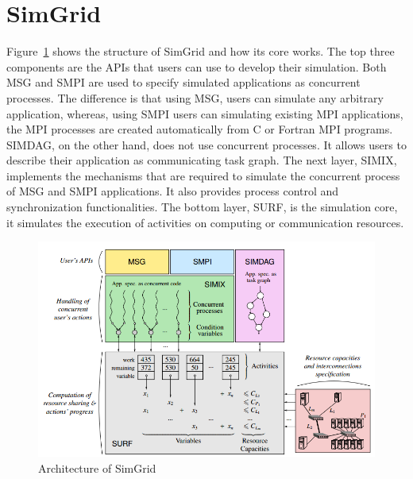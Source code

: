 \section{SimGrid}
Figure~\ref{fig:SimGrid} shows the structure of SimGrid and how its core works. The top three components are the APIs that users can use to develop their simulation. Both MSG and SMPI are used to specify simulated applications as concurrent processes. The difference is that using MSG, users can simulate any arbitrary application, whereas, using SMPI users can simulating existing MPI applications, the MPI processes are created automatically from C or Fortran MPI programs. SIMDAG, on the other hand, does not use concurrent processes. It allows users to describe their application as communicating task graph. The next layer, SIMIX, implements the mechanisms that are required to simulate the concurrent process of MSG and SMPI applications. It also provides process control and synchronization functionalities. The bottom layer, SURF, is the simulation core, it simulates the execution of activities on computing or communication resources.

\begin{figure}[ht]
	\begin{center}
		\includegraphics[width=14cm]{images/SimGrid.png}
		\caption{Architecture of SimGrid}
		\label{fig:SimGrid}
	\end{center}
\end{figure}

